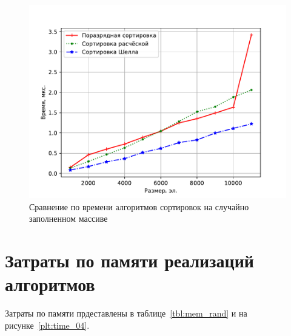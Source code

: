 \begin{figure}[H]
	\centering
	\includegraphics[height=0.4\textheight, page=3]{img/figures.pdf}
	\caption{Сравнение по времени алгоритмов сортировок на случайно заполненном массиве}
	\label{plt:time_03}
\end{figure}

\section{Затраты по памяти реализаций алгоритмов}

Затраты по памяти прдеставлены в таблице~\ref{tbl:mem_rand} и на рисунке~\ref{plt:time_04}.

